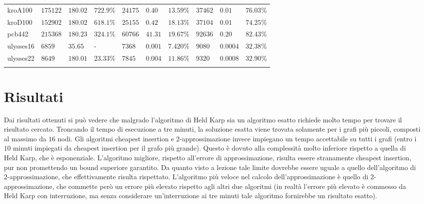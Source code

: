 \begin{tabularx}{\textwidth}{*{10}{Y}}
    kroA100 & $175122$ & $180.02$ & $722.9$\% & $24175$ & $0.40$ & $13.59$\% & $37462$ & $0.01$ & $76.03$\%\\
    kroD100 & $152902$ & $180.02$ & $618.1$\% & $25155$ & $0.42$ & $18.13$\% & $37104$ & $0.01$ & $74.25$\%\\
    pcb442 & $215368$ & $180.23$ & $324.1$\% & $60766$ & $41.31$ & $19.67$\% & $92636$ & $0.20$ & $82.43$\%\\
    ulysses16 & $6859$ & $35.65$ & - & $7368$ & $0.001$ & $7.420$\% & $9080$ & $0.0004$ & $32.38$\%\\
    ulysses22 & $8649$ & $180.01$ & $23.33$\% & $7845$ & $0.004$ & $11.86$\% & $9320$ & $0.0008$ & $32.90$\%\\
    \bottomrule
    \caption{Risultati}\label{tab:risultati}
\end{tabularx}

\normalsize

\clearpage

\section{Risultati\label{sec:risultati}}
Dai risultati ottenuti si può vedere che malgrado l'algoritmo di Held Karp sia un algoritmo esatto richiede molto tempo per trovare il risultato cercato. Troncando il tempo di esecuzione a tre minuti, la soluzione esatta viene trovata solamente per i grafi più piccoli, composti al massimo da $16$ nodi.
Gli algoritmi cheapest insertion e 2-approssimazione invece impiegano un tempo accettabile su tutti i grafi (entro i $10$ minuti impiegati da cheapest insertion per il grafo più grande). Questo è dovuto alla complessità molto inferiore rispetto a quella di Held Karp, che è esponenziale.
L'algoritmo migliore, rispetto all'errore di approssimazione, risulta essere stranamente cheapest insertion, pur non promettendo un bound superiore garantito.
Da quanto visto a lezione tale limite dovrebbe essere uguale a quello dell'algoritmo di 2-approssimazione, che effettivamente risulta rispettato.
L'algoritmo più veloce nel calcolo dell'approssimazione è quello di 2-approssimazione, che commette però un errore più elevato rispetto agli altri due algoritmi (in realtà l'errore più elevato è commesso da Held Karp con interruzione, ma senza considerare un'interruzione ai tre minuti tale algoritmo fornirebbe un risultato esatto).